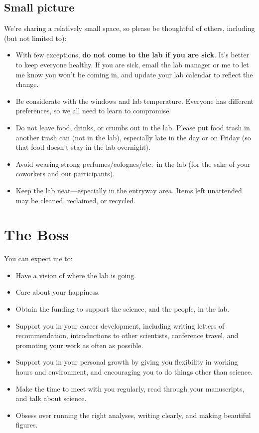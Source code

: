 \documentclass[letterpaper,12pt,oneside]{memoir}
\begin{document}
\subsection{Small picture}

We're sharing a relatively small space, so please be thoughtful of others, including (but not limited to):

\begin{itemize}
\item With few exceptions, \textbf{do not come to the lab if you are sick}. It's better to keep everyone healthy. If you are sick, email the lab manager or me to let me know you won't be coming in, and update your lab calendar to reflect the change.
\item Be considerate with the windows and lab temperature. Everyone has different preferences, so we all need to learn to compromise.
\item Do not leave food, drinks, or crumbs out in the lab. Please put food trash in another trash can (not in the lab), especially late in the day or on Friday (so that food doesn't stay in the lab overnight).
\item Avoid wearing strong perfumes/colognes/etc.\ in the lab (for the sake of your coworkers and our participants).
\item Keep the lab neat---especially in the entryway area. Items left unattended may be cleaned, reclaimed, or recycled.
\end{itemize}


\section{The Boss}

You can expect me to:

\begin{itemize}
\item Have a vision of where the lab is going.
\item Care about your happiness.
\item Obtain the funding to support the science, and the people, in the lab.
\item Support you in your career development, including writing letters of recommendation, introductions to other scientists, conference travel, and promoting your work as often as possible.
\item Support you in your personal growth by giving you flexibility in working hours and environment, and encouraging you to do things other than science.
\item Make the time to meet with you regularly, read through your manuscripts, and talk about science.
\item Obsess over running the right analyses, writing clearly, and making beautiful figures.
\end{itemize}
\end{document}
